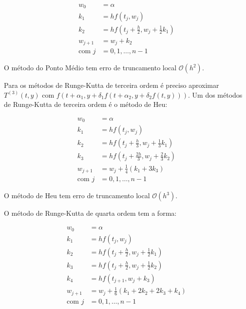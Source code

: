 \documentclass[final,5p]{elsarticle}
\numberwithin{equation}{section}
\begin{document}
        \begin{align}
            w_0 &= \alpha \nonumber \\
            k_1 &= hf\left(t_j,w_j\right) \nonumber \\
            k_2 &= hf\left(t_j+\frac{h}{2},w_j+\frac{1}{2}k_1\right) \nonumber \\
            w_{j+1} &= w_{j} + k_2 \label{eq:pontomedio} \\
            \text{com } j&=0,1,\ldots,n-1 \nonumber
        \end{align}

        O método do Ponto Médio tem erro de truncamento local $\mathcal{O}(h^2)$.

        Para os métodos de Runge-Kutta de terceira ordem é preciso aproximar $T^{(3)}(t,y)$ com $f(t+\alpha_1,y+\delta_1f(t+\alpha_2,y+\delta_2f(t,y)))$. Um dos métodos de Runge-Kutta de terceira ordem é o método de Heu:

        \begin{align}
            w_0 &= \alpha \nonumber \\
            k_1 &= hf\left(t_j,w_j\right) \nonumber \\
            k_2 &= hf\left(t_j+\frac{h}{3},w_j+\frac{1}{3}k_1\right) \nonumber \\
            k_3 &= hf\left(t_j+\frac{2h}{3},w_j+\frac{2}{3}k_2\right) \nonumber \\
            w_{j+1} &= w_{j} + \frac{1}{4} (k_1 + 3 k_3) \label{eq:heu} \\
            \text{com } j&=0,1,\ldots,n-1 \nonumber
        \end{align}

        O método de Heu tem erro de truncamento local $\mathcal{O}(h^3)$.

        O método de Runge-Kutta de quarta ordem tem a forma:

        \begin{align}
            w_0 &= \alpha \nonumber \\
            k_1 &= hf\left(t_j,w_j\right) \nonumber \\
            k_2 &= hf\left(t_j+\frac{h}{2},w_j+\frac{1}{2}k_1\right) \nonumber \\
            k_3 &= hf\left(t_j+\frac{h}{2},w_j+\frac{1}{2}k_2\right) \nonumber \\
            k_4 &= hf\left(t_{j+1},w_j+k_3\right) \nonumber \\
            w_{j+1} &= w_{j} + \frac{1}{6} (k_1 + 2k_2 + 2k_3 + k_4) \label{eq:rk4} \\
            \text{com } j&=0,1,\ldots,n-1 \nonumber
        \end{align}
\end{document}
